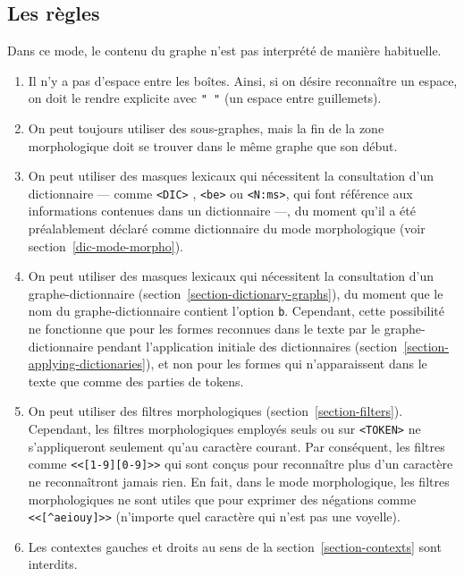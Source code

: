 \subsection{Les règles}
Dans ce mode, le contenu du graphe n'est pas interprété de manière habituelle.
\begin{enumerate}
\item Il n'y a pas d'espace entre les boîtes. Ainsi, si on désire reconnaître un espace,
	on doit le rendre explicite avec \verb+" "+ (un espace entre guillemets).

\item On peut toujours utiliser des sous-graphes, mais la fin de la zone morphologique
	doit se trouver dans le même graphe que son début.

\item On peut utiliser des masques lexicaux qui nécessitent la consultation d'un dictionnaire
--- comme \verb+<DIC>+ , \verb+<be>+ ou \verb+<N:ms>+, qui font référence aux informations contenues dans un dictionnaire ---, du moment qu'il a été préalablement déclaré comme dictionnaire
du mode morphologique (voir section~\ref{dic-mode-morpho}). 
   
\item On peut utiliser des masques lexicaux qui nécessitent la consultation d'un graphe-dictionnaire
(section~\ref{section-dictionary-graphs}), du moment que le nom du graphe-dictionnaire contient l'option \verb+b+.
Cependant, cette possibilité ne fonctionne que pour les formes reconnues dans le texte par le graphe-dictionnaire
pendant l'application initiale des dictionnaires (section~\ref{section-applying-dictionaries}),
et non pour les formes qui n'apparaissent dans le texte que comme des parties de tokens.
   
\item On peut utiliser des filtres morphologiques (section~\ref{section-filters}). Cependant, les filtres
           morphologiques employés seuls ou sur \verb+<TOKEN>+
	ne s'appliqueront seulement qu'au caractère courant. Par 
	conséquent, les filtres comme \verb+<<[1-9][0-9]>>+ qui sont conçus pour reconnaître plus d'un
	caractère ne reconnaîtront jamais rien. En fait, dans le mode morphologique, 
	les filtres morphologiques ne sont utiles que pour exprimer des négations
	comme \verb+<<[^aeiouy]>>+ (n'importe quel caractère qui n'est pas une voyelle). 
   
\item Les contextes gauches et droits au sens de la section~\ref{section-contexts} sont interdits.


\end{enumerate}

